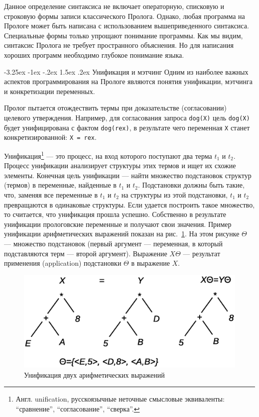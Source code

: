 \documentclass[12pt, openany, twoside]{book} %
\makeatletter
\renewcommand\section{\@startsection {section}{1}{\z@}%
                                   {-3.25ex \@plus -1ex \@minus -.2ex}%
                                   {1.5ex \@plus.2ex}%
                                   {\normalfont\large\bfseries}}
\makeatother
\begin{document}
Данное определение синтаксиса не включает операторную, списковую и строковую формы записи классического Пролога. Однако, любая программа на Прологе может быть написана с использованием вышеприведенного синтаксиса. Специальные формы  только упрощают понимание программы. Как мы видим, синтаксис Пролога не требует пространного объяснения. Но для написания хороших программ необходимо глубокое понимание языка.

\section{Унификация и мэтчинг} Одним из наиболее важных аспектов программирования на Прологе являются понятия унификации, мэтчинга и конкретизации переменных.

Пролог пытается отождествить термы при доказательстве (согласовании) целевого утверждения. Например, для согласования запроса {\tt  dog(X)} цель {\tt  dog(X)} будет унифицирована с фактом {\tt dog(rex)}, в результате чего переменная {\tt Х} станет конкретизированной: {\tt Х = rex}.

Унификация\footnote{Англ. unification, русскоязычные неточные смысловые эквиваленты: ``сравнение'', ``согласование'', ``сверка''.} --- это процесс, на вход которого поступают два терма $t_1$ и $t_2$. Процесс унификации анализирует структуры этих термов и ищет их схожие элементы. Конечная цель унификации --- найти множество подстановок структур (термов) в переменные, найденные в $t_1$ и $t_2$. Подстановки должны быть такие, что, заменяя все переменные в $t_1$ и $t_2$ на структуры из этой подстановки, $t_1$ и $t_2$ превращаются в одинаковые структуры. Если удается построить такое множество, то считается, что унификация прошла успешно. Собственно в результате унификации прологовские переменные и получают свои значения. Пример унификации арифметических выражений показан на рис.~\ref{pic:unification}. На этом рисунке $\Theta$ --- множество подстановок (первый аргумент --- переменная, в который подставляются терм --- второй аргумент). Выражение $X\Theta$ --- результат применения (application) подстановки $\Theta$ в выражение $X$.
\begin{figure}[hbt]
\begin{center}
\includegraphics[scale=0.5]{pics/unification.eps}
\end{center}
\caption{Унификация двух арифметических выражений}
\label{pic:unification}
\end{figure}
\end{document}

